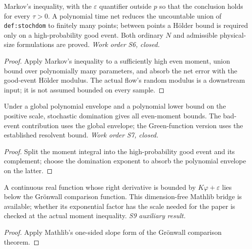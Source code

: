 \begin{lemma}\label{lem:bridge-prec}
  \leanok
  Markov's inequality, with the $\varepsilon$ quantifier outside $p$ so that the
  conclusion holds for every $\tau>0$.  A polynomial time net reduces the
  uncountable union of \texttt{def:stochdom} to finitely many points; between
  points a H\"older bound is required only on a high-probability good event.
  Both ordinary $N$ and admissible physical-size formulations are proved.
  \emph{Work order S6, closed.}
\end{lemma}
\begin{proof}\leanok
  Apply Markov's inequality to a sufficiently high even moment, union bound
  over polynomially many parameters, and absorb the net error with the
  good-event H\"older modulus.  The actual flow's random modulus is a
  downstream input; it is not assumed bounded on every sample.
\end{proof}

\begin{lemma}\label{lem:bridge-moment}
  \leanok
  Under a global polynomial envelope and a polynomial lower bound on the
  positive scale, stochastic domination gives all even-moment bounds. The
  bad-event contribution uses the global envelope; the Green-function version
  uses the established resolvent bound. \emph{Work order S7, closed.}
\end{lemma}
\begin{proof}\leanok
  Split the moment integral into the high-probability good event and its
  complement; choose the domination exponent to absorb the polynomial
  envelope on the latter.
\end{proof}

\begin{lemma}\label{lem:gronwall-base}
  \leanok
  A continuous real function whose right derivative is bounded by
  $K\varphi+\varepsilon$ lies below the Gr\"onwall comparison function.
  This dimension-free Mathlib bridge is available; whether its exponential
  factor has the scale needed for the paper is checked at the actual moment
  inequality. \emph{S9 auxiliary result.}
\end{lemma}
\begin{proof}\leanok
  Apply Mathlib's one-sided slope form of the Gr\"onwall comparison theorem.
\end{proof}

